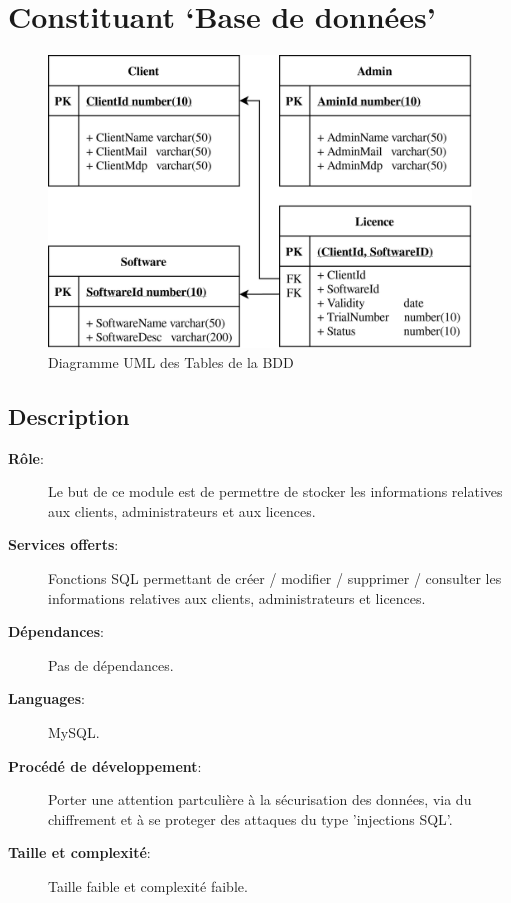 \section{Constituant `Base de données'}

\begin{figure}[hp!]
	\centering
	\includegraphics[width=\textwidth - 2cm]{../png/SQL_table.png}
	\caption{Diagramme UML des Tables de la BDD}
	\label{fig:fig2}
\end{figure}

\subsection{Description}
\begin{description}
	\item[\textbf{Rôle}:]
		Le but de ce module est de permettre de stocker les informations relatives aux
		clients, administrateurs et aux licences.
	\item[\textbf{Services offerts}:]
		Fonctions SQL permettant de créer / modifier / supprimer / consulter les 
        informations relatives aux clients, administrateurs et licences.
	\item[\textbf{Dépendances}:]
		Pas de dépendances.		
	\item[\textbf{Languages}:]
		MySQL.
	\item[\textbf{Procédé de développement}:]
	  Porter une attention partculière à la sécurisation des données, via
	  du chiffrement et à se proteger des attaques du type 'injections SQL'. 
	\item[\textbf{Taille et complexité}:]
		Taille faible et complexité faible. 
\end{description}

